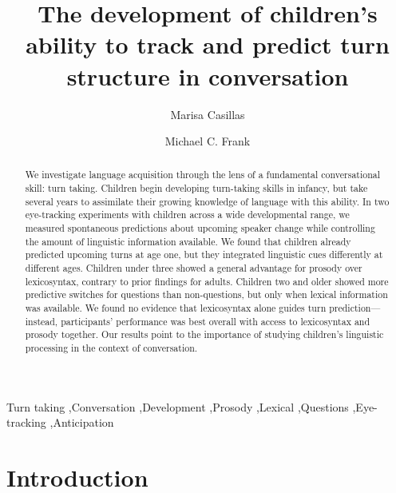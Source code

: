 \documentclass[authoryear, 12pt]{elsarticle}
\begin{document}
\begin{frontmatter}

\title{The development of children's ability to track and predict turn structure in conversation}

\author[MPI]{Marisa Casillas}
\address[MPI]{Max Planck Institute for Psycholinguistics, Nijmegen}

\author[StanfordPSY]{Michael C. Frank}

\address[StanfordPSY]{Department of Psychology, Stanford University}

\begin{abstract}
We investigate language acquisition through the lens of a fundamental conversational skill: turn taking. Children begin developing turn-taking skills in infancy, but take several years to assimilate their growing knowledge of language with this ability. In two eye-tracking experiments with children across a wide developmental range, we measured spontaneous predictions about upcoming speaker change while controlling the amount of linguistic information available. We found that children already predicted upcoming turns at age one, but they integrated linguistic cues differently at different ages. Children under three showed a general advantage for prosody over lexicosyntax, contrary to prior findings for adults. Children two and older showed more predictive switches for questions than non-questions, but only when lexical information was available. We found no evidence that lexicosyntax alone guides turn prediction---instead, participants' performance was best overall with access to lexicosyntax and prosody together. Our results point to the importance of studying children's linguistic processing in the context of conversation.
\end{abstract}

\begin{keyword}
Turn taking \sep Conversation \sep Development \sep Prosody \sep Lexical \sep Questions \sep Eye-tracking \sep Anticipation

\end{keyword}

\end{frontmatter}


\section{Introduction}
\label{sec:intro}
\end{document}
